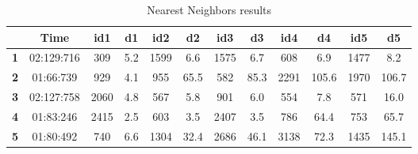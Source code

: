 \documentclass[12pt]{article}
\begin{document}
	\begin{table}[H]
		\centering
		\begin{tabular}{|c|c|c|c|c|c|c|c|c|c|c|c|}
			\hline
			\textbf{}  & \textbf{Time} & \textbf{id1} & \textbf{d1} & \textbf{id2} & \textbf{d2} & \textbf{id3} & \textbf{d3} & \textbf{id4} & \textbf{d4} & \textbf{id5} & \textbf{d5} \\ \hline
			\textbf{1} & 02:129:716    & 309          & 5.2           & 1599         & 6.6           & 1575         & 6.7           & 608          & 6.9           & 1477         & 8.2           \\ \hline
			\textbf{2} & 01:66:739     & 929          & 4.1           & 955          & 65.5          & 582          & 85.3          & 2291         & 105.6         & 1970         & 106.7         \\ \hline
			\textbf{3} & 02:127:758    & 2060         & 4.8           & 567          & 5.8           & 901          & 6.0           & 554          & 7.8           & 571          & 16.0          \\ \hline
			\textbf{4} & 01:83:246     & 2415         & 2.5           & 603          & 3.5           & 2407         & 3.5           & 786          & 64.4          & 753          & 65.7          \\ \hline
			\textbf{5} & 01:80:492     & 740          & 6.6           & 1304         & 32.4          & 2686         & 46.1          & 3138         & 72.3          & 1435         & 145.1         \\ \hline
		\end{tabular}
	\caption{Nearest Neighbors results}
	\label{nnresults}
	\end{table}
	
\end{document}
